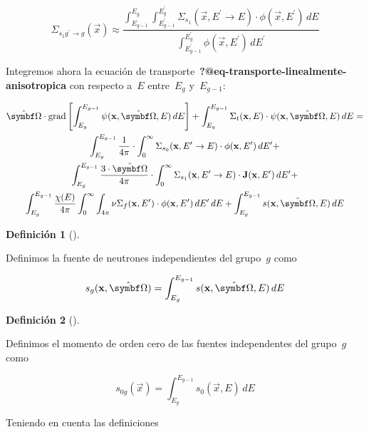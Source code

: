\documentclass[
  12pt,
  a4paper,
  table]{scrbook}
\theoremstyle{plain}
\theoremstyle{definition}
\newtheorem{definition}{Definición}[chapter]
\theoremstyle{plain}
\theoremstyle{plain}
\theoremstyle{remark}
\begin{document}
\[
\Sigma_{s_1 g^\prime \rightarrow g}(\vec{x}) \approx
\frac{\displaystyle \int_{E_{g-1}}^{E_g} \int_{E^\prime_{g-1}}^{E^\prime_g} \Sigma_{s_1}(\vec{x}, E^{\prime} \rightarrow E) \cdot \phi(\vec{x},E^\prime) \,dE}{\displaystyle \int_{E^\prime_{g-1}}^{E^\prime_g} \phi(\vec{x},E^\prime) \, dE^\prime}
\]

Integremos ahora la ecuación de
transporte~\textbf{?@eq-transporte-linealmente-anisotropica} con
respecto a~\(E\) entre~\(E_g\) y~\(E_{g-1}\):

\[
\begin{gathered}
 \omegaversor \cdot \text{grad} \left[ \int_{E_g}^{E_{g-1}} \psi(\vec{x}, \omegaversor, E) \, dE \right]  +
 \int_{E_g}^{E_{g-1}} \Sigma_t(\vec{x}, E) \cdot \psi(\vec{x}, \omegaversor, E) \, dE = \\
 \int_{E_g}^{E_{g-1}} \frac{1}{4\pi} \cdot \int_{0}^{\infty} \Sigma_{s_0}(\vec{x}, E^{\prime} \rightarrow E) \cdot \phi(\vec{x}, E^{\prime}) \, dE^\prime + \\
 \int_{E_g}^{E_{g-1}} \frac{3 \cdot \omegaversor}{4\pi} \cdot \int_{0}^{\infty} \Sigma_{s_1}(\vec{x}, E^{\prime} \rightarrow E) \cdot \vec{J}(\vec{x}, E^{\prime}) \, dE^\prime + \\
 \int_{E_g}^{E_{g-1}} \frac{\chi(E)}{4\pi} \int_{0}^{\infty} \int_{4\pi} \nu\Sigma_f(\vec{x}, E^\prime) \cdot \phi(\vec{x}, E^\prime) \, dE^\prime \, dE +
 \int_{E_g}^{E_{g-1}} s(\vec{x}, \omegaversor, E) \, dE
\end{gathered}
\]

\begin{definition}[]\protect\hypertarget{def-s-g}{}\label{def-s-g}

Definimos la fuente de neutrones independientes del grupo~\(g\) como

\[
s_g(\vec{x}, \omegaversor) = \int_{E_g}^{E_{g-1}} s(\vec{x}, \omegaversor, E) \, dE
\]

\end{definition}

\begin{definition}[]\protect\hypertarget{def-s0-g}{}\label{def-s0-g}

Definimos el momento de orden cero de las fuentes independentes del
grupo~\(g\) como

\[
s_{0g}(\vec{x}) = \int_{E_g}^{E_{g-1}} s_0(\vec{x}, E) \, dE
\]

\end{definition}

Teniendo en cuenta las definiciones
\end{document}
